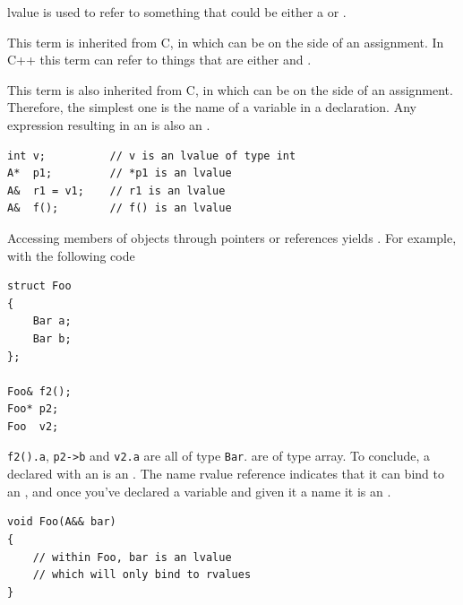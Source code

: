  lvalue is used to refer to something that could be 
either a  or .

This term is inherited from C, in which  can be on the 
 side of an assignment. In C++ this term can refer to 
things that are either  and .

This term is also inherited from C, in which  can be 
on the  side of an assignment. Therefore, the simplest one 
is the name of a variable in a declaration.
\newline
Any expression resulting in an  is also an 
.
\begin{lstlisting}[language=C+++]
int v;          // v is an lvalue of type int
A*  p1;         // *p1 is an lvalue
A&  r1 = v1;    // r1 is an lvalue
A&  f();        // f() is an lvalue
\end{lstlisting}

Accessing members of objects through pointers or references yields 
. For example, with the following code
\begin{lstlisting}[language=C+++]
struct Foo
{
    Bar a;
    Bar b;
};

Foo& f2();
Foo* p2;
Foo  v2;
\end{lstlisting}
\texttt{f2().a}, \texttt{p2->b} and \texttt{v2.a} are all 
 of type \texttt{Bar}.
\newline
{} are  of type array.
\newline
To conclude, a  declared with an 
 is an . The name rvalue 
reference indicates that it can bind to an , and once 
you've declared a variable and given it a name it is an .
\begin{lstlisting}[language=C+++]
void Foo(A&& bar)
{
    // within Foo, bar is an lvalue 
    // which will only bind to rvalues
}
\end{lstlisting}

